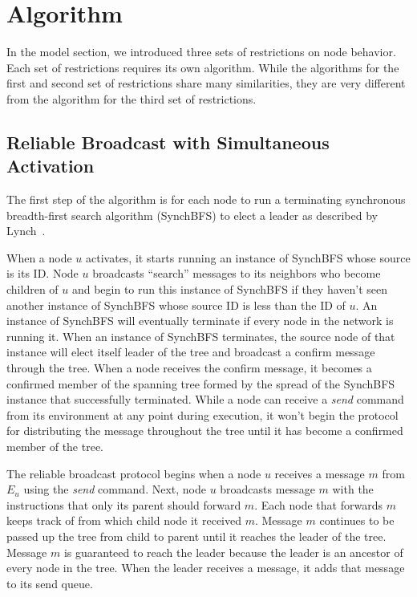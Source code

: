 \documentclass[english]{article}
\begin{document}
\section{Algorithm}

In the model section, we introduced three sets of restrictions on node behavior. Each set of restrictions requires its own algorithm. While the algorithms for the first and second set of restrictions share many similarities, they are very different from the algorithm for the third set of restrictions.

  \subsection {Reliable Broadcast with Simultaneous Activation}

The first step of the algorithm is for each node to run a terminating synchronous breadth-first search algorithm (SynchBFS) to elect a leader as described by Lynch~\cite{Lynch:1996}.

When a node $u$ activates, it starts running an instance of SynchBFS whose source is its ID. Node $u$ broadcasts ``search'' messages to its neighbors who become children of $u$ and begin to run this instance of SynchBFS if they haven't seen another instance of SynchBFS whose source ID is less than the ID of $u$. An instance of SynchBFS will eventually terminate if every node in the network is running it. When an instance of SynchBFS terminates, the source node of that instance will elect itself leader of the tree and broadcast a confirm message through the tree. When a node receives the confirm message, it becomes a confirmed member of the spanning tree formed by the spread of the SynchBFS instance that successfully terminated. While a node can receive a \textit{send} command from its environment at any point during execution, it won't begin the protocol for distributing the message throughout the tree until it has become a confirmed member of the tree.


The reliable broadcast protocol begins when a node $u$ receives a message $m$ from $E_u$ using the \textit{send} command. Next, node $u$ broadcasts message $m$ with the instructions that only its parent should forward $m$. Each node that forwards $m$ keeps track of from which child node it received $m$. Message $m$ continues to be passed up the tree from child to parent until it reaches the leader of the tree. Message $m$ is guaranteed to reach the leader because the leader is an ancestor of every node in the tree. When the leader receives a message, it adds that message to its send queue.
\end{document}

